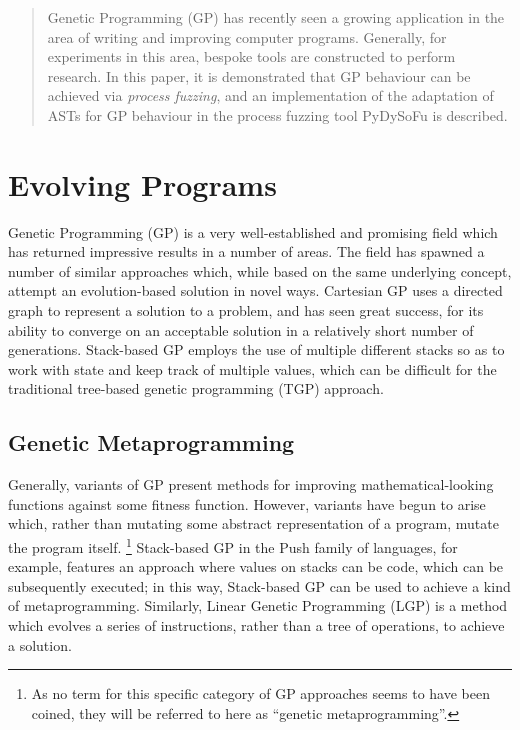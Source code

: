 \documentclass[draft,12pt]{llncs}   %
\begin{document}
\maketitle

\begin{abstract}
  Genetic Programming (GP) has recently seen a growing application in the area
  of writing and improving computer programs. Generally, for experiments in this
  area, bespoke tools are constructed to perform research. In this paper, it is
  demonstrated that GP behaviour can be achieved via \emph{process fuzzing}, and
  an implementation of the adaptation of ASTs for GP behaviour in the
  process fuzzing tool PyDySoFu is described.
\end{abstract}


\section{Evolving Programs}
Genetic Programming (GP) is a very well-established and promising field which
has returned impressive results in a number of areas. The field has spawned a
number of similar approaches which, while based on the same underlying concept,
attempt an evolution-based solution in novel ways. Cartesian
GP\cite{miller2011cartesian} uses a directed graph to
represent a solution to a problem, and has seen great success, for its ability
to converge on an acceptable solution in a relatively short number of
generations. Stack-based GP\cite{perkis1994stack} employs the use of multiple different stacks so
as to work with state and keep track of multiple values, which can be difficult
for the traditional tree-based genetic programming (TGP) approach.\par

\subsection{Genetic Metaprogramming}
Generally, variants of GP present methods for improving mathematical-looking
functions against some fitness function. However, variants have begun to arise
which, rather than mutating some abstract representation of a program, mutate
the program itself. \footnote{As no term for this specific category of GP
  approaches seems to have been coined, they will be referred to here as
  ``genetic metaprogramming''.} Stack-based GP in the Push family of
languages\cite{spector2001autoconstructive}, for example, features an approach
where values on stacks can be code, which can be subsequently executed; in this
way, Stack-based GP can be used to achieve a kind of metaprogramming. Similarly, Linear Genetic Programming\cite{brameier2007linear}
(LGP) is a method which evolves a series of instructions, rather than a tree of
operations, to achieve a solution.\par
\end{document}
